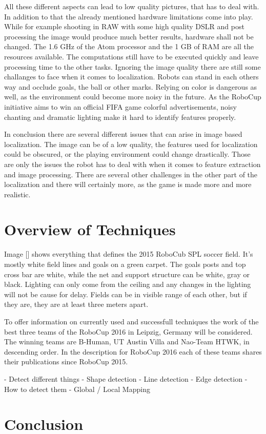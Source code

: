 \documentclass[12pt, a4paper]{scrartcl}
\begin{document}
  All these different aspects can lead to low quality pictures, that has to deal with. In addition to that the already mentioned hardware limitations come into play. While for example shooting in RAW with some high quality DSLR and post processing the image would produce much better results, hardware shall not be changed. The 1.6 GHz of the Atom processor and the 1 GB of RAM are all the resources available. The computations still have to be executed quickly and leave processing time to the other tasks. Ignoring the image quality there are still some challanges to face when it comes to localization. Robots can stand in each others way and occlude goals, the ball or other marks. Relying on color is dangerous as well, as the environment could become more noisy in the future. As the RoboCup initiative aims to win an official FIFA game colorful advertisements, noisy chanting and dramatic lighting make it hard to identify features properly.

  In conclusion there are several different issues that can arise in image based localization. The image can be of a low quality, the features used for localization could be obscured, or the playing environment could change drastically. Those are only the issues the robot has to deal with when it comes to feature extraction and image processing. There are several other challenges in the other part of the localization and there will certainly more, as the game is made more and more realistic.

  \section{Overview of Techniques}
  Image [] shows everything that defines the 2015 RoboCub SPL soccer field. It's mostly white field lines and goals on a green carpet. The goals posts and top cross bar are white, while the net and support structure can be white, gray or black. Lighting can only come from the ceiling and any changes in the lighting will not be cause for delay. Fields can be in visible range of each other, but if they are, they are at least three meters apart.

  To offer information on currently used and successfull techniques the work of the best three teams of the RoboCup 2016 in Leipzig, Germany will be considered. The winning teams are B-Human, UT Austin Villa and Nao-Team HTWK, in descending order. In the description for RoboCup 2016 each of these teams shares their publications since RoboCup 2015.

  - Detect different things
  - Shape detection
  - Line detection
  - Edge detection
  - How to detect them
  - Global / Local Mapping

  \section{Conclusion}
\end{document}
